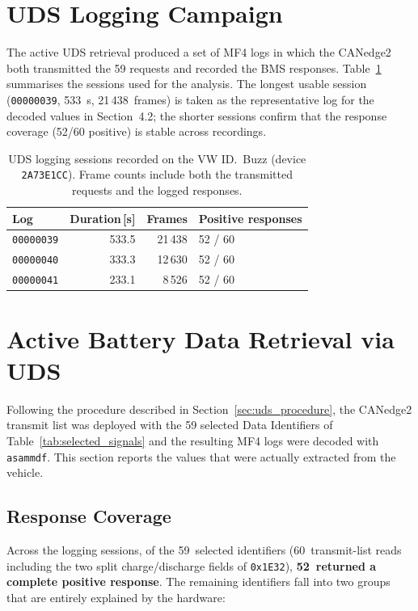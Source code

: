 \documentclass[11pt,a4paper,oneside,parskip=half]{scrreprt}
\providecommand{\hex}{}\renewcommand{\hex}[1]{\texttt{0x#1}}
\begin{document}
\section{UDS Logging Campaign}
The active UDS retrieval produced a set of MF4 logs in which the CANedge2 both transmitted the 59 requests and recorded the BMS responses. Table~\ref{tab:uds_logs} summarises the sessions used for the analysis. The longest usable session (\texttt{00000039}, 533~s, 21\,438~frames) is taken as the representative log for the decoded values in Section~4.2; the shorter sessions confirm that the response coverage (52/60 positive) is stable across recordings.

\begin{table}[H]
\caption{UDS logging sessions recorded on the VW ID.~Buzz (device \texttt{2A73E1CC}). Frame counts include both the transmitted requests and the logged responses.}
\label{tab:uds_logs}
\centering
\begin{tabular}{lrrl}
\toprule
\textbf{Log} & \textbf{Duration\,[s]} & \textbf{Frames} & \textbf{Positive responses} \\
\midrule
\texttt{00000039} & 533.5 & 21\,438 & 52 / 60 \\
\texttt{00000040} & 333.3 & 12\,630 & 52 / 60 \\
\texttt{00000041} & 233.1 &  8\,526 & 52 / 60 \\
\bottomrule
\end{tabular}
\end{table}

\section{Active Battery Data Retrieval via UDS}
Following the procedure described in Section~\ref{sec:uds_procedure}, the CANedge2 transmit list was deployed with the 59 selected Data Identifiers of Table~\ref{tab:selected_signals} and the resulting MF4 logs were decoded with \texttt{asammdf}. This section reports the values that were actually extracted from the vehicle.

\subsection{Response Coverage}
Across the logging sessions, of the 59~selected identifiers (60~transmit-list reads including the two split charge/discharge fields of \hex{1E32}), \textbf{52~returned a complete positive response}. The remaining identifiers fall into two groups that are entirely explained by the hardware:
\end{document}

